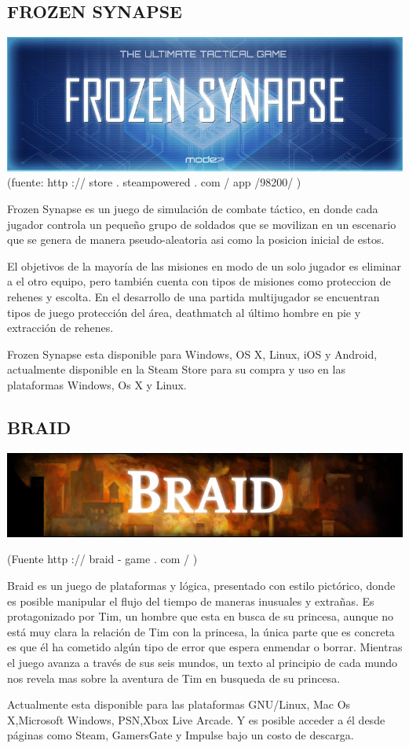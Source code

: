 \subsection*{FROZEN SYNAPSE}
\includegraphics[scale=0.5]{img/cp07/img0704.png}
(fuente: http :// store . steampowered . com / app /98200/ )

Frozen Synapse es un juego de simulación de combate táctico,
en donde cada jugador controla un pequeño grupo de soldados
que se movilizan en un escenario que se genera de manera
pseudo-aleatoria asi como la posicion inicial de estos.

El objetivos de la mayoría de las misiones en modo de un solo
jugador es eliminar a el otro equipo, pero también cuenta con
tipos de misiones como proteccion de rehenes y escolta. En el
desarrollo de una partida multijugador se encuentran tipos de
juego protección del área, deathmatch al último hombre en pie y
extracción de rehenes.

Frozen Synapse esta disponible para Windows, OS X, Linux, iOS
y Android, actualmente disponible en la Steam Store para su
compra y uso en las plataformas Windows, Os X y Linux.


\subsection*{BRAID}
\includegraphics[scale=0.5]{img/cp07/img0705.png}

(Fuente http :// braid - game . com / )

Braid es un juego de plataformas y lógica, presentado con estilo
pictórico, donde es posible manipular el flujo del tiempo de
maneras inusuales y extrañas. Es protagonizado por Tim, un
hombre que esta en busca de su princesa, aunque no está muy
clara la relación de Tim con la princesa, la única parte que es
concreta es que él ha cometido algún tipo de error que espera
enmendar o borrar. Mientras el juego avanza a través de sus seis
mundos, un texto al principio de cada mundo nos revela mas
sobre la aventura de Tim en busqueda de su princesa.

Actualmente esta disponible para las plataformas GNU/Linux,
Mac Os X,Microsoft Windows, PSN,Xbox Live Arcade. Y es
posible acceder a él desde páginas como Steam, GamersGate y
Impulse bajo un costo de descarga.

